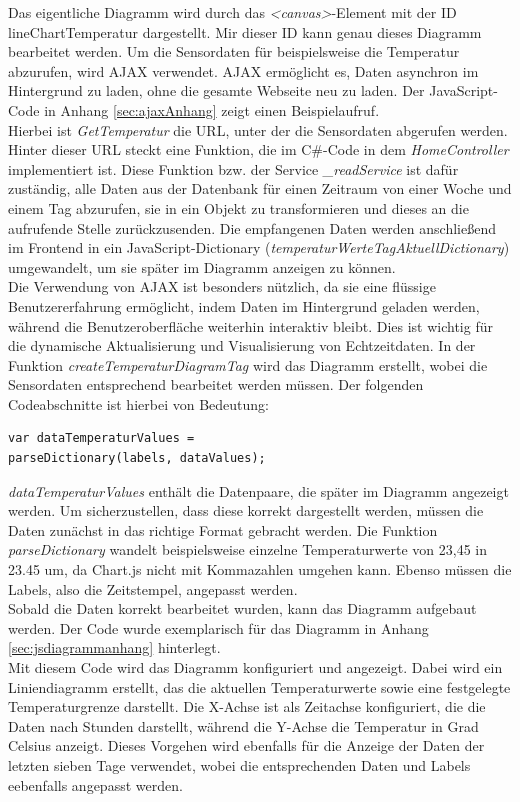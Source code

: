 \documentclass[conference]{IEEEtran}
\begin{document}
Das eigentliche Diagramm wird durch das \textit{<canvas>}-Element mit der ID \textit{}{lineChartTemperatur} dargestellt. Mir dieser ID kann genau dieses Diagramm bearbeitet werden.
Um die Sensordaten für beispielsweise die Temperatur abzurufen, wird AJAX verwendet. AJAX ermöglicht es, Daten asynchron im Hintergrund zu laden, ohne die gesamte Webseite neu zu laden. Der JavaScript-Code in Anhang \ref{sec:ajaxAnhang} zeigt einen Beispielaufruf. \\
Hierbei ist \textit{GetTemperatur} die URL, unter der die Sensordaten abgerufen werden. Hinter dieser URL steckt eine Funktion, die im C\#-Code in dem \textit{HomeController} implementiert ist. Diese Funktion bzw. der Service \textit{\_readService} ist dafür zuständig, alle Daten aus der Datenbank für einen Zeitraum von einer Woche und einem Tag abzurufen, sie in ein Objekt zu transformieren und dieses an die aufrufende Stelle zurückzusenden. Die empfangenen Daten werden anschließend im Frontend in ein JavaScript-Dictionary (\textit{temperaturWerteTagAktuellDictionary}) umgewandelt, um sie später im Diagramm anzeigen zu können. \\
Die Verwendung von AJAX ist besonders nützlich, da sie eine flüssige Benutzererfahrung ermöglicht, indem Daten im Hintergrund geladen werden, während die Benutzeroberfläche weiterhin interaktiv bleibt. Dies ist wichtig für die dynamische Aktualisierung und Visualisierung von Echtzeitdaten.
In der Funktion \textit{createTemperaturDiagramTag} wird das Diagramm erstellt, wobei die Sensordaten entsprechend bearbeitet werden müssen. Der folgenden Codeabschnitte ist hierbei von Bedeutung: \\
\begin{verbatim}var dataTemperaturValues = 
parseDictionary(labels, dataValues); \end{verbatim}
\textit{dataTemperaturValues} enthält die Datenpaare, die später im Diagramm angezeigt werden. Um sicherzustellen, dass diese korrekt dargestellt werden, müssen die Daten zunächst in das richtige Format gebracht werden. Die Funktion \textit{parseDictionary} wandelt beispielsweise einzelne Temperaturwerte von 23,45 in 23.45 um, da Chart.js nicht mit Kommazahlen umgehen kann. Ebenso müssen die Labels, also die Zeitstempel, angepasst werden. \\
Sobald die Daten korrekt bearbeitet wurden, kann das Diagramm aufgebaut werden. Der Code wurde exemplarisch für das Diagramm in Anhang \ref{sec:jsdiagrammanhang} hinterlegt. \\
Mit diesem Code wird das Diagramm konfiguriert und angezeigt. Dabei wird ein Liniendiagramm erstellt, das die aktuellen Temperaturwerte sowie eine festgelegte Temperaturgrenze darstellt. Die X-Achse ist als Zeitachse konfiguriert, die die Daten nach Stunden darstellt, während die Y-Achse die Temperatur in Grad Celsius anzeigt. Dieses Vorgehen wird ebenfalls für die Anzeige der Daten der letzten sieben Tage verwendet, wobei die entsprechenden Daten und Labels eebenfalls angepasst werden.
\end{document}
